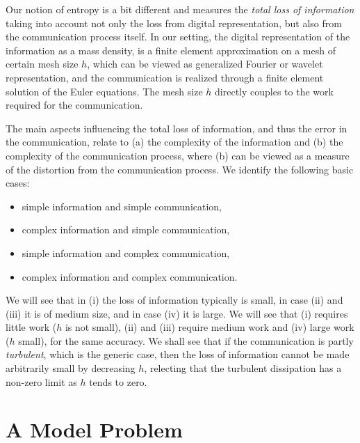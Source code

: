 Our notion of entropy is a bit different
and measures the \emph{total loss of information}
taking into account not only the loss from digital representation, but
also from the communication process itself. 
In our setting, the digital representation of the information
as a mass density, is a finite element approximation on a mesh
of certain mesh size $h$, which can
be viewed as generalized Fourier or wavelet representation,
and the communication is realized through a finite element
solution of the Euler equations. The mesh size $h$ directly
couples to the work required for the communication.

The main aspects influencing the
total loss of information, and thus the error in the communication,
relate to (a) the complexity of the information and (b) the
complexity of the communication process, where (b) can be viewed as
a measure of the distortion from the communication process. We 
identify the following basic cases:
\begin{itemize}
\item[(i)] simple information and simple communication,
\item[(ii)] complex information and simple communication,
\item[(iii)] simple information and complex communication,
\item[(iv)] complex information and complex communication.
\end{itemize}
We will see that in (i) the loss of information typically is small,
in case (ii) and (iii) it is of medium size, and in case (iv) it is large.
We will see that (i) requires little work ($h$ is not small), 
(ii) and (iii) require medium work
and (iv) large work ($h$ small), for the same accuracy. 
We shall see that if the communication is partly \emph{turbulent}, 
which is the generic case, then the loss
of information cannot be made arbitrarily small 
by decreasing $h$, relecting that the 
turbulent dissipation has a non-zero limit as $h$ tends to zero.  
 



 

\section{A Model Problem}

